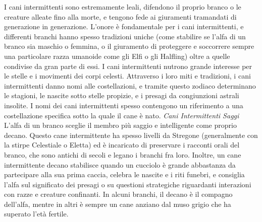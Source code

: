 \begin{multicols}{2}
I cani intermittenti sono estremamente leali, difendono il proprio branco o le creature alleate fino alla morte, e tengono fede ai giuramenti tramandati di generazione in generazione. L’onore è fondamentale per i cani intermittenti, e differenti branchi hanno spesso tradizioni uniche (come stabilire se l’alfa di un branco sia maschio o femmina, o il giuramento di proteggere e soccorrere sempre una particolare razza umanoide come gli Elfi o gli Halfling) oltre a quelle condivise da gran parte di essi. I cani intermittenti nutrono grande interesse per le stelle e i movimenti dei corpi celesti. Attraverso i loro miti e tradizioni, i cani intermittenti danno nomi alle costellazioni, e tramite questo zodiaco determinano le stagioni, le nascite sotto stelle propizie, e i presagi da congiunzioni astrali insolite. I nomi dei cani intermittenti spesso contengono un riferimento a una costellazione specifica sotto la quale il cane è nato.
\textit{Cani Intermittenti Saggi}\\

L’alfa di un branco sceglie il membro più saggio e intelligente come proprio decano. Questo cane intermittente ha spesso livelli da Stregone (generalmente con la stirpe Celestiale o Eletta) ed è incaricato di preservare i racconti orali del branco, che sono antichi di secoli e legano i branchi fra loro. Inoltre, un cane intermittente decano stabilisce quando un cucciolo è grande abbastanza da partecipare alla sua prima caccia, celebra le nascite e i riti funebri, e consiglia l’alfa sul significato dei presagi o su questioni strategiche riguardanti interazioni con razze e creature confinanti. In alcuni branchi, il decano è il compagno dell’alfa, mentre in altri è sempre un cane anziano dal muso grigio che ha superato l’età fertile. \\


\end{multicols}

